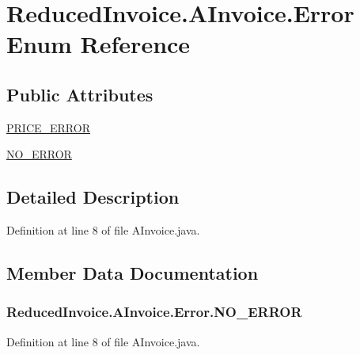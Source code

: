 \hypertarget{enum_reduced_invoice_1_1_a_invoice_1_1_error}{\section{Reduced\-Invoice.\-A\-Invoice.\-Error Enum Reference}
\label{enum_reduced_invoice_1_1_a_invoice_1_1_error}
}
\subsection*{Public Attributes}
\begin{DoxyCompactItemize}
\item 
\hyperlink{enum_reduced_invoice_1_1_a_invoice_1_1_error_a5c521b3b1cc9827b5dba56d42a770481}{P\-R\-I\-C\-E\-\_\-\-E\-R\-R\-O\-R}
\item 
\hyperlink{enum_reduced_invoice_1_1_a_invoice_1_1_error_ab758351b18ce3163abca9924287fc6df}{N\-O\-\_\-\-E\-R\-R\-O\-R}
\end{DoxyCompactItemize}


\subsection{Detailed Description}


Definition at line 8 of file A\-Invoice.\-java.



\subsection{Member Data Documentation}
\hypertarget{enum_reduced_invoice_1_1_a_invoice_1_1_error_ab758351b18ce3163abca9924287fc6df}{
\subsubsection[{N\-O\-\_\-\-E\-R\-R\-O\-R}]{\setlength{\rightskip}{0pt plus 5cm}Reduced\-Invoice.\-A\-Invoice.\-Error.\-N\-O\-\_\-\-E\-R\-R\-O\-R}}\label{enum_reduced_invoice_1_1_a_invoice_1_1_error_ab758351b18ce3163abca9924287fc6df}


Definition at line 8 of file A\-Invoice.\-java.

